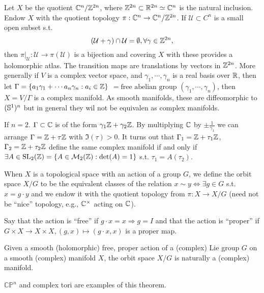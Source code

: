 \begin{example}
 Let $X$ be the quotient $\mathbb{C}^{n} / \mathbb{Z}^{2n}$, where $\mathbb{Z}^{2n}\subset \mathbb{R}^{2n}\simeq \mathbb{C}^{n}$ is the natural inclusion. Endow $X$ with the quotient topology $\pi:\mathbb{C}^{n}\to \mathbb{C}^{n} /\mathbb{Z}^{2n}$. If $\mathcal{U}\subset C^{n}$ is a small open subset s.t. 
 \[
   (\mathcal{U}+\gamma)\cap \mathcal{U}=\emptyset,\forall  \gamma \in \mathbb{Z}^{2n},
 \] 
 then $\pi|_{\mathcal{U}}:\mathcal{U}\to \pi (\mathcal{U})$ is a bijection and covering $X$ with these provides a holomorphic atlas. The transition maps are translations by vectors in $\mathbb{Z}^{2n}$. More generally if $V$ is a complex vector space, and $\gamma_1,\cdots ,\gamma_n$ is a real basis over $\mathbb{R}$, then let $\Gamma=\left\{a_1\gamma_1+\cdots a_n\gamma_n:a_i \in \mathbb{Z}\right\} $ $= \text{free abelian group }(\gamma_1,\cdots ,\gamma_n)$, then $X=V / \Gamma$ is a complex manifold. As smooth manifolds, these are diffeomorphic to $(\mathbb{S}^{1})^{n}$ but in general they wil not be equivalen as complex manifolds.

 If $n=2$. $\Gamma \subset \mathbb{C}$ is of the form $\gamma_1\mathbb{Z}+\gamma_2\mathbb{Z}$. By multiplying $\mathbb{C}$ by $\pm \frac{1}{\gamma_1}$ we can arrange $\Gamma =\mathbb{Z}+\tau \mathbb{Z}$ with $\Im(\tau )> 0$. It turns out that $\Gamma_1=\mathbb{Z}+\tau_1 \mathbb{Z}$, $\Gamma_2=\mathbb{Z}+\tau _2\mathbb{Z}$ define the same complex manifold if and only if $\exists A\in \operatorname{SL}_2(\mathbb{Z})=\left\{A\in \mathcal{M}_2(\mathbb{Z}):\operatorname{det}(A)=1\right\} $ s.t. $\tau_1=A(\tau_2)$.  
\end{example}

\begin{definition}
  When $X$ is a topological space with an action of a group $G$, we define the orbit space $X / G$ to be the equivalent classes of the relation $x\sim y\Leftrightarrow \exists g\in G$ s.t. $x=g\cdot y$ and we endow it with the quotient topology from $\pi :X\to X /G$ (need not be ``nice'' topology, e.g., $\mathbb{C}^\times $ acting on $\mathbb{C}$).
  
  Say that the action is ``free'' if $g\cdot x=x \Rightarrow g=I$ and that the action is ``proper'' if $G\times  X\to X \times X,(g,x)\mapsto (g\cdot x,x)$ is a proper map.
\end{definition}
\begin{theorem}
  Given a smooth (holomorphic) free, proper action of a (complex) Lie group  $G$ on a smooth (complex) manifold $X$, the orbit space $X /G$ is naturally a (complex) manifold.
\end{theorem}

\begin{example}
  $\mathbb{CP}^{n}$ and complex tori are examples of this theorem.
\end{example}

